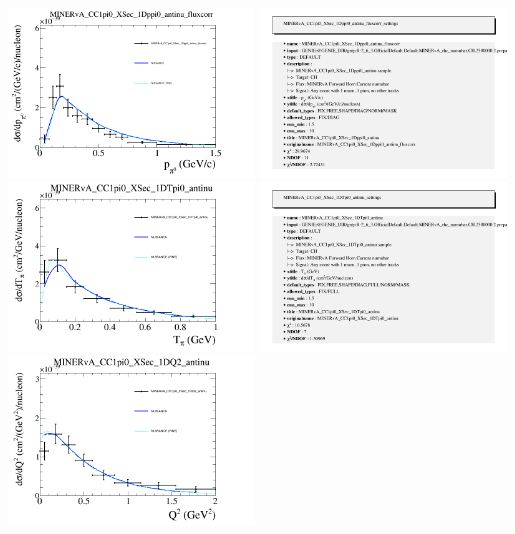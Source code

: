 \documentclass{article}
\begin{document}
\centering
\includegraphics[width=0.49\textwidth]{figures/nuisance_MINERvA_CC1pi0_XSec_1Dppi0_antinu_fluxcorr_comp.png}
\includegraphics[width=0.49\textwidth]{figures/nuisance_MINERvA_CC1pi0_XSec_1Dppi0_antinu_fluxcorr_info.png}
\centering
\includegraphics[width=0.49\textwidth]{figures/nuisance_MINERvA_CC1pi0_XSec_1DTpi0_antinu_comp.png}
\includegraphics[width=0.49\textwidth]{figures/nuisance_MINERvA_CC1pi0_XSec_1DTpi0_antinu_info.png}
\centering
\includegraphics[width=0.49\textwidth]{figures/nuisance_MINERvA_CC1pi0_XSec_1DQ2_antinu_comp.png}
\end{document}

